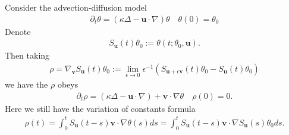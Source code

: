 \documentclass[twoside]{article}
\numberwithin{equation}{section}
\newcommand{\CC}{\mathbb{C}}
\newcommand{\bfU}{\mathbf{u}}
\newcommand{\bfV}{\mathbf{v}}
\begin{document}
Consider the advection-diffusion model
\begin{align}
	\partial_t \theta = (\kappa \Delta- \bfU \cdot \nabla) \theta \quad \theta(0) = \theta_0
\end{align}
Denote
\begin{align}
	S_\bfU(t) \theta_0 := \theta(t; \theta_0, \bfU).
\end{align}
Then taking 
\begin{align}
  \rho =  \nabla_\bfV S_\bfU(t) \theta_0 := \lim_{\epsilon \to 0} \epsilon^{-1} ( S_{\bfU+ \epsilon \bfV}(t) \theta_0 -  S_{\bfU}(t) \theta_0 )
\end{align}
we have the $\rho$ obeys
\begin{align}
\partial_t \rho = (\kappa \Delta- \bfU \cdot \nabla) +  \bfV \cdot \nabla \theta \quad \rho(0) = 0.
\end{align}
Here we still have the variation of constants formula
\begin{align}
	\rho(t) = \int_0^t S_\bfU(t-s) \bfV \cdot \nabla \theta(s) ds =  \int_0^t S_\bfU(t-s) \bfV \cdot \nabla S_\bfU(s) \theta_0 ds.
\end{align}
%






\begin{footnotesize}


\end{footnotesize}
 
%
%
%
%
%
%
%
%
%
%
\end{document}
